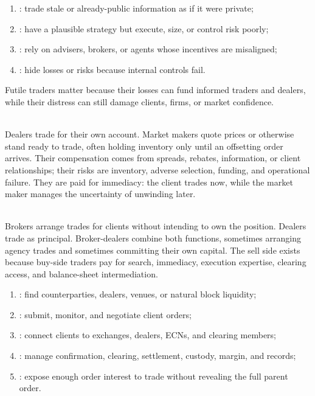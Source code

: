 \documentclass[a4paper,oneside,openany]{book}
\begin{document}
\begin{taxonomy} 
\begin{enumerate}[label=\roman*.]
\setlength{\itemsep}{0pt}
\item {}: trade stale or already-public information as if it were private;
\item {}: have a plausible strategy but execute, size, or control risk poorly;
\item {}: rely on advisers, brokers, or agents whose incentives are misaligned;
\item {}: hide losses or risks because internal controls fail.
\end{enumerate}
Futile traders matter because their losses can fund informed traders and dealers, while their distress can still damage clients, firms, or market confidence.
\end{taxonomy}

\begin{mechanism} \\
Dealers trade for their own account. Market makers quote prices or otherwise stand ready to trade, often holding inventory only until an offsetting order arrives. Their compensation comes from spreads, rebates, information, or client relationships; their risks are inventory, adverse selection, funding, and operational failure.
They are paid for immediacy: the client trades now, while the market maker manages the uncertainty of unwinding later.
\end{mechanism}

\begin{taxonomy} \\
Brokers arrange trades for clients without intending to own the position. Dealers trade as principal. Broker-dealers combine both functions, sometimes arranging agency trades and sometimes committing their own capital. The sell side exists because buy-side traders pay for search, immediacy, execution expertise, clearing access, and balance-sheet intermediation.
\end{taxonomy}

\begin{taxonomy} 
\begin{enumerate}[label=\roman*.]
\setlength{\itemsep}{0pt}
\item {}: find counterparties, dealers, venues, or natural block liquidity;
\item {}: submit, monitor, and negotiate client orders;
\item {}: connect clients to exchanges, dealers, ECNs, and clearing members;
\item {}: manage confirmation, clearing, settlement, custody, margin, and records;
\item {}: expose enough order interest to trade without revealing the full parent order.
\end{enumerate}
\end{taxonomy}
\end{document}
